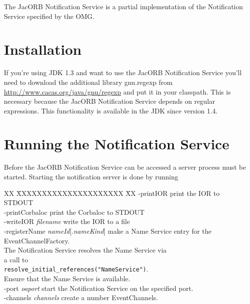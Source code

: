 %
%

The JacORB Notification Service is a partial implementation of
the Notification Service specified by the OMG.

\section{Installation}
\label{sec:installation}

If you're using JDK 1.3 and want to use the JacORB Notification
Service you'll need 
to download the additional library gnu.regexp from 
\href{http://www.cacas.org/java/gnu/regexp}{http://www.cacas.org/java/gnu/regexp}
and put it in your classpath. This is necessary because the JacORB
Notification Service depends on regular expressions. This
functionality is available in the JDK since version 1.4.

\section{Running the Notification Service}
\label{sec:ntfy-running}

Before the JacORB Notification Service can be accessed a server
process must be started. Starting
the notification server is done by running



\begin{tabbing}
XX \= XXXXXXXXXXXXXXXXXXXXX \= XX \kill
\> -printIOR \> print the IOR to STDOUT \\
\> -printCorbaloc \> print the Corbaloc to STDOUT \\
\> -writeIOR \emph{filename} \> write the IOR to a file \\
\> -registerName \emph{nameId}[.\emph{nameKind}] \> make a Name Service entry
for the EventChannelFactory. \\
\> \> The Notification Service resolves the Name Service via \\
\> \> a call to \\
\> \> \texttt{resolve\_initial\_references("NameService")}. \\
\> \> Ensure that the Name Service is available. \\
\> -port \emph{oaport} \> start the Notification Service on the specified
port. \\
\> -channels \emph{channels} \> create a number EventChannels. \\
\end{tabbing}

